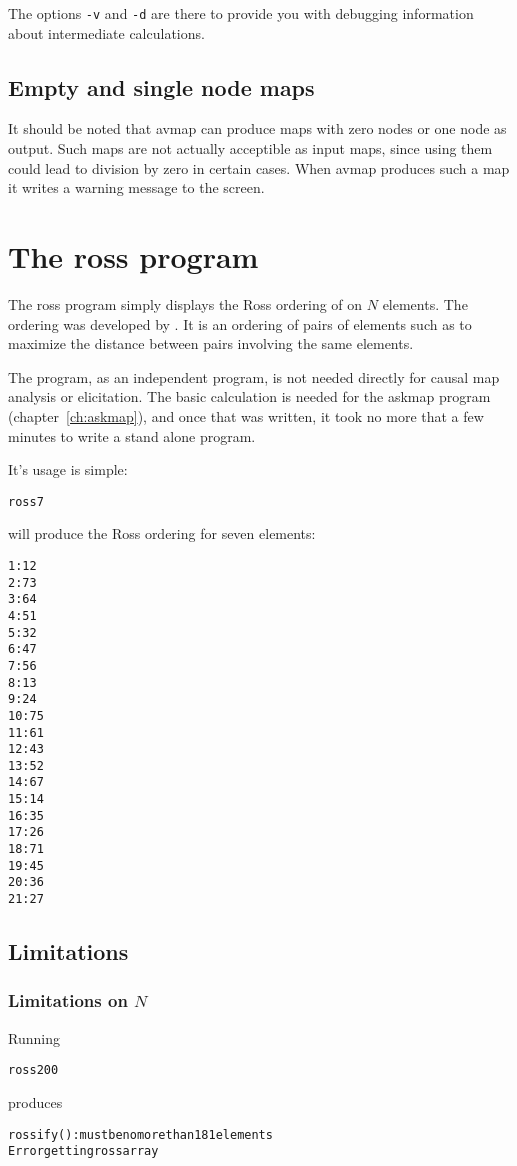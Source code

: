 \documentclass[%
	11pt,
        a4paper,
        twoside]{workrep}
\newcommand*{\prg}[1]{\textsf{#1}}		%
\newcommand*{\opt}[1]{\texttt{#1}}		%
\begin{document}
The options \opt{-v} and \opt{-d} are there to provide
you with debugging information about intermediate calculations.

\section{Empty and single node maps}\label{sec:avmap:empty}

It should be noted that \prg{avmap} can produce maps with
zero nodes or one node as output.  Such maps are not actually
acceptible as input maps, since using them could lead to division
by zero in certain cases.  When \prg{avmap} produces such a map
it writes a warning message to the screen.

\chapter{The \prg{ross} program}\label{ch:ross}

The \prg{ross} program simply displays the Ross ordering of on $N$
elements.  The ordering was developed by .  It is
an ordering of pairs of elements such as to maximize the distance
between pairs involving the same elements. 

The program, as an independent program, is not needed directly for
causal map analysis or elicitation.  The basic calculation is needed
for the \prg{askmap} program (chapter~\ref{ch:askmap}), and once that
was written, it took no more that a few minutes to write a stand
alone program.

It's usage is simple:
\begin{alltt}
 ross 7
\end{alltt}
will produce the Ross ordering for seven elements:
\begin{alltt}
1: 1 2
2: 7 3
3: 6 4
4: 5 1
5: 3 2
6: 4 7
7: 5 6
8: 1 3
9: 2 4
10: 7 5
11: 6 1
12: 4 3
13: 5 2
14: 6 7
15: 1 4
16: 3 5
17: 2 6
18: 7 1
19: 4 5
20: 3 6
21: 2 7
\end{alltt}

\section{Limitations}

\subsection{Limitations on $N$}

Running
\begin{alltt}
 ross 200
\end{alltt}
produces
\begin{alltt}
rossify(): must be no more than 181 elements
Error getting ross array
\end{alltt}
\end{document}
